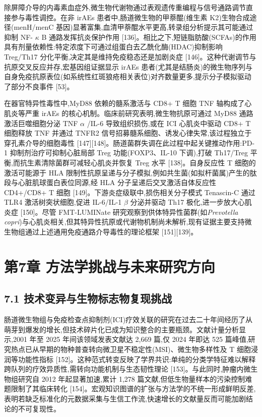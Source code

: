 除屏障介导的内毒素血症外,微生物代谢物通过表观遗传重编程与信号通路调节直接参与毒性调控。在非 irAEs 患者中,肠道微生物的甲萘醌(维生素 K2)生物合成途径(menH/menC 基因)显著富集,血清甲萘醌水平更高,转录组分析提示其可能通过抑制 NF- \(\kappa\) B 通路发挥抗炎保护作用 {[}136{]}。相比之下,短链脂肪酸(SCFAs)的作用具有剂量依赖性:特定浓度下可通过组蛋白去乙酰化酶(HDAC)抑制影响 Treg/Th17 分化平衡,决定其是维持免疫稳态还是加剧炎症 {[}146{]}。这种代谢调节与抗原交叉反应并存,宏基因组证据显示 irAEs 患者(尤其是结肠炎)的微生物序列与自身免疫抗原表位(如系统性红斑狼疮相关表位)对齐数量更多,提示分子模拟驱动了部分不良事件 {[}53{]}。

在器官特异性毒性中,MyD88 依赖的髓系激活与 CD8+ T 细胞 TNF 轴构成了心肌炎等严重 irAEs 的核心机制。临床前研究表明,微生物抗原可通过 MyD88 通路激活巨噬细胞分泌 TNF \(\alpha\) /IL-6 导致组织损伤,或在 ICI 心肌炎中驱动 CD8+ T 细胞释放 TNF 并通过 TNFR2 信号招募髓系细胞、诱发心律失常,该过程独立于穿孔素介导的细胞毒性 {[}147{]}{[}148{]}。肠道菌群失调在此过程中起关键推动作用:PD-1 抑制剂治疗可抑制心脏局部 Treg 功能(FOXP3、IL-10 下调),打破 Th17/Treg 平衡,而抗生素清除菌群可减轻心肌炎并恢复 Treg 水平 {[}138{]}。自身反应性 T 细胞的激活可能源于 HLA 限制性抗原呈递与分子模拟,例如共生菌(如拟杆菌属)产生的肽段与心脏肌球蛋白表位同源,经 HLA 分子呈递后交叉激活自体反应性 CD4+/CD8+ T 细胞 {[}149{]}。下游炎症级联中,损伤相关分子模式 Tenascin-C 通过 TLR4 激活树突状细胞,促进 IL-6/IL-1 \(\beta\) 分泌并驱动 Th17 极化,进一步放大心肌炎症 {[}150{]}。尽管 FMT-LUMINate 研究观察到供体特异性菌群(如\emph{Prevotella copri})与心肌炎相关,但其特异性抗原或代谢物机制尚未解析,现有证据主要支持微生物组通过上述通用免疫通路介导毒性的理论框架 {[}151{]}{[}139{]}。

\section{第7章 方法学挑战与未来研究方向}\label{ux7b2c7ux7ae0-ux65b9ux6cd5ux5b66ux6311ux6218ux4e0eux672aux6765ux7814ux7a76ux65b9ux5411}

\subsection{7.1 技术变异与生物标志物复现挑战}\label{ux6280ux672fux53d8ux5f02ux4e0eux751fux7269ux6807ux5fd7ux7269ux590dux73b0ux6311ux6218}

肠道微生物组与免疫检查点抑制剂(ICI)疗效关联的研究在过去二十年间经历了从萌芽到爆发的增长,但技术碎片化已成为知识整合的主要瓶颈。文献计量分析显示,2001 年至 2025 年间该领域发表文献达 2,669 篇,仅 2024 年即达 525 篇峰值,研究热点已从早期的物种普查转向微卫星不稳定性(MSI)、微生物多样性及 T 细胞浸润等功能性指标 {[}152{]}。这种范式转变反映了学界共识:单纯的分类学特征难以解释跨队列的疗效异质性,需转向功能机制与生态韧性理论 {[}153{]}。与此同时,肿瘤内微生物组研究自 2012 年起显著加速,累计 1,278 篇文献,但低生物量样本的污染控制难题限制了其临床转化 {[}154{]}。宏观知识图谱的扩张与方法学的不统一形成鲜明反差,表明若缺乏标准化的元数据采集与生信工作流,快速增长的文献量反而可能加剧结论的不可复现性。

